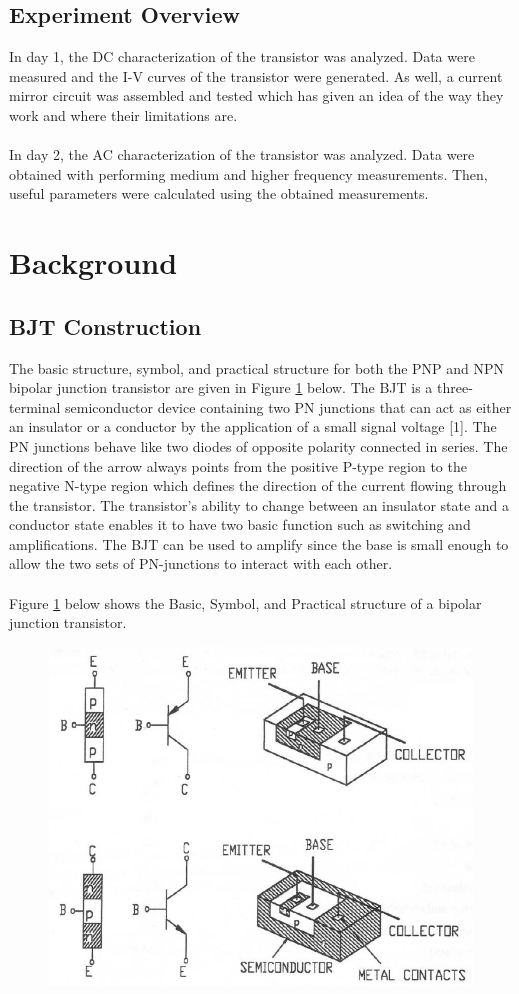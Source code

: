 \documentclass{article}
\begin{document}
	\subsection{Experiment Overview}
	In day 1, the DC characterization of the transistor was analyzed.
	Data were measured and the I-V curves of the transistor were generated.
	As well, a current mirror circuit was assembled and tested which has given an idea of the way they work and where their limitations are.\\\\
	In day 2, the AC characterization of the transistor was analyzed.
	Data were obtained with performing medium and higher frequency measurements.
	Then, useful parameters were calculated using the obtained measurements.
	
	\section{Background}
	\subsection{BJT Construction}
	The basic structure, symbol, and practical structure for both the PNP and NPN bipolar junction transistor are given in Figure \ref{f1} below.
	The BJT is a three-terminal semiconductor device containing two PN junctions that can act as either an insulator or a conductor by the application of a small signal voltage [1].
	The PN junctions behave like two diodes of opposite polarity connected in series.
	The direction of the arrow always points from the positive P-type region to the negative N-type region which defines the direction of the current flowing through the transistor.
	The transistor’s ability to change between an insulator state and a conductor state enables it to have two basic function such as switching and amplifications.
	The BJT can be used to amplify since the base is small enough to allow the two sets of PN-junctions to interact with each other.\\\\
	Figure \ref{f1} below shows the Basic, Symbol, and Practical structure of a bipolar junction transistor.
	
	\begin{figure}[!ht]
		\centering
		\includegraphics[width=0.5\linewidth]{structures_of_bjt.png}
		\label{f1}
	\end{figure}
	
\end{document}

